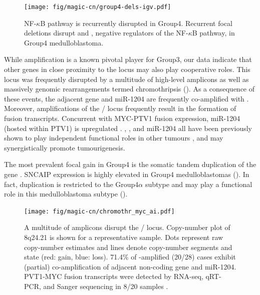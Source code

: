 \begin{figure}
	\centering
	\texttt{[image: fig/magic-cn/group4-dels-igv.pdf]}
	\caption[NF-$\kappa$B pathway is recurrently disrupted in Group4]
	{
	NF-$\kappa$B pathway is recurrently disrupted in Group4.
	Recurrent focal deletions disrupt  and , negative regulators of the NF-$\kappa$B pathway, in Group4 medulloblastoma.
	}
	\label{fig:group4-dels-igv}
\end{figure}

While  amplification is a known pivotal player for Group3, our data indicate that other genes in close proximity to the  locus may also play cooperative roles. This locus was frequently disrupted by a multitude of high-level amplicons  as well as massively genomic rearrangements termed chromothripsis (). As a consequence of these events, the adjacent  gene and miR-1204 are frequently co-amplified with . Moreover, amplifications of the / locus frequently result in the formation of fusion transcripts. Concurrent with MYC-PTV1 fusion expression, miR-1204 (hosted within PTV1) is upregulated . , , and miR-1204 all have been previously shown to play independent functional roles in other tumours , and may synergistically promote tumourigenesis.

The most prevalent focal gain in Group4 is the somatic tandem duplication of the  gene . SNCAIP expression is highly elevated in Group4 medulloblastomas (). In fact,  duplication is restricted to the Group4$\alpha$ subtype and may play a functional role in this medulloblastoma subtype ().

\begin{figure}[t]
	\begin{center}
		\texttt{[image: fig/magic-cn/chromothr\_myc\_ai.pdf]}
	\end{center}
	\caption[A multitude of amplicons disrupt the / locus]
	{
	A multitude of amplicons disrupt the / locus.
	Copy-number plot of 8q24.21 is shown for a representative sample. Dots represent raw copy-number estimates and lines denote copy-number segments and state (red: gain, blue: loss). 71.4\% of -amplified (20/28) cases exhibit (partial) co-amplification of adjacent non-coding  gene and miR-1204. PVT1-MYC fusion transcripts were detected by RNA-seq, qRT-PCR, and Sanger sequencing in 8/20 samples .
	}
	\label{fig:chromothr_myc}
\end{figure}


